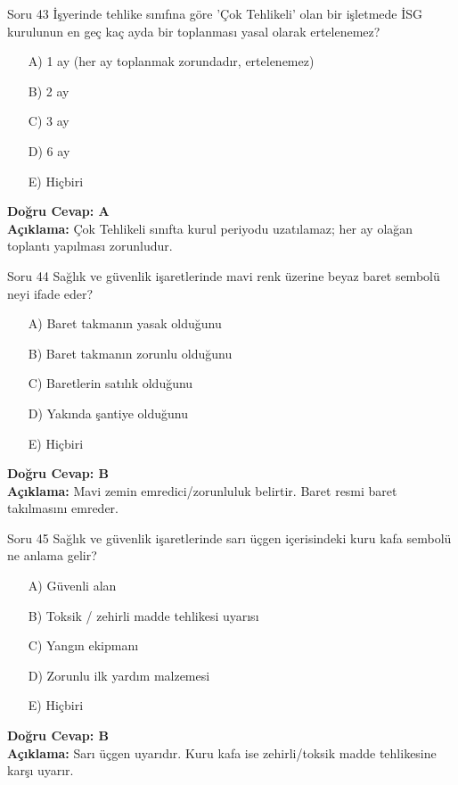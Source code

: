 \documentclass[12pt,a4paper]{article}
\begin{document}
\begin{testcard}{Soru 43}
    İşyerinde tehlike sınıfına göre 'Çok Tehlikeli' olan bir işletmede İSG kurulunun en geç kaç ayda bir toplanması yasal olarak ertelenemez?
    \begin{itemize}
        \item[A)] 1 ay (her ay toplanmak zorundadır, ertelenemez)
        \item[B)] 2 ay
        \item[C)] 3 ay
        \item[D)] 6 ay
        \item[E)] Hiçbiri
    \end{itemize}
    \tcblower
    \textbf{Doğru Cevap: A} \\
    \textbf{Açıklama:} Çok Tehlikeli sınıfta kurul periyodu uzatılamaz; her ay olağan toplantı yapılması zorunludur.
\end{testcard}

\begin{testcard}{Soru 44}
    Sağlık ve güvenlik işaretlerinde mavi renk üzerine beyaz baret sembolü neyi ifade eder?
    \begin{itemize}
        \item[A)] Baret takmanın yasak olduğunu
        \item[B)] Baret takmanın zorunlu olduğunu
        \item[C)] Baretlerin satılık olduğunu
        \item[D)] Yakında şantiye olduğunu
        \item[E)] Hiçbiri
    \end{itemize}
    \tcblower
    \textbf{Doğru Cevap: B} \\
    \textbf{Açıklama:} Mavi zemin emredici/zorunluluk belirtir. Baret resmi baret takılmasını emreder.
\end{testcard}

\begin{testcard}{Soru 45}
    Sağlık ve güvenlik işaretlerinde sarı üçgen içerisindeki kuru kafa sembolü ne anlama gelir?
    \begin{itemize}
        \item[A)] Güvenli alan
        \item[B)] Toksik / zehirli madde tehlikesi uyarısı
        \item[C)] Yangın ekipmanı
        \item[D)] Zorunlu ilk yardım malzemesi
        \item[E)] Hiçbiri
    \end{itemize}
    \tcblower
    \textbf{Doğru Cevap: B} \\
    \textbf{Açıklama:} Sarı üçgen uyarıdır. Kuru kafa ise zehirli/toksik madde tehlikesine karşı uyarır.
\end{testcard}
\end{document}
